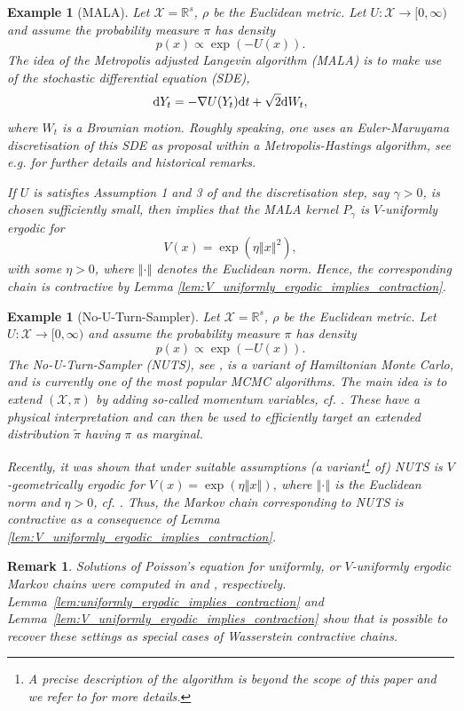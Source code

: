 \documentclass[12pt]{article}
\theoremstyle{plain}
\newtheorem{rem}[thm]{Remark}
\newtheorem{example}[thm]{Example}
\renewcommand{\d}{{\rm d}}
\newcommand{\norm}[1]{\left\Vert #1 \right\Vert}
\newcommand{\R}{\mathbb{R}}
\newcommand{\cX}{\mathcal{X}}
\begin{document}
{\begin{example}[MALA]\label{ex:MALA}
Let $\cX = \R^s$, $\rho$ be the Euclidean metric. 
Let $U \colon \cX \to [0, \infty)$ and assume the probability measure $\pi$ has density 
\[
p(x) \propto \exp(-U(x)).
\]
The idea of the Metropolis adjusted Langevin algorithm (MALA) is to make use of the stochastic differential equation (SDE), 
\[
\d Y_t = - \nabla U(Y_t)\d t + \sqrt{2}\d W_t, 
\]
where $W_t$ is a Brownian motion. 
Roughly speaking, one uses an Euler-Maruyama discretisation of this SDE as proposal within a Metropolis-Hastings algorithm, see e.g. \cite{durmus2023MALA} for further details and historical remarks. 

If $U$ is satisfies Assumption 1 and 3 of \cite{durmus2023MALA} and the discretisation step, say $\gamma>0$, is chosen sufficiently small, then \cite[Theorem 1]{durmus2023MALA} implies that the MALA kernel $P_\gamma$ is $V$-uniformly ergodic for 
\[
V(x) = \exp (\eta \norm{x}^2),
\]
with some $\eta >0$, where $\norm{\cdot}$ denotes the Euclidean norm. Hence, the corresponding chain is contractive by Lemma \ref{lem:V_uniformly_ergodic_implies_contraction}.
\end{example}

\begin{example}[No-U-Turn-Sampler]\label{ex:NUTS}
Let $\cX = \R^s$, $\rho$ be the Euclidean metric. 
Let $U \colon \cX \to [0, \infty)$ and assume the probability measure $\pi$ has density 
\[
p(x) \propto \exp(-U(x)).
\]
The No-U-Turn-Sampler (NUTS), see \cite{hoffman2014no}, is a variant of Hamiltonian Monte Carlo, and is currently one of the most popular MCMC algorithms. 
The main idea is to extend $(\cX, \pi)$ 
by adding so-called momentum variables, cf. \cite{hoffman2014no}. 
These  have a physical interpretation and can then be used to efficiently target an extended distribution $\widetilde{\pi}$ having $\pi$ as marginal.  

Recently, it was shown that under suitable assumptions (a variant\footnote{A precise description of the algorithm is beyond the scope of this paper and we refer to \cite{durmus2023convergence} for more details.} of) NUTS is $V$-geometrically ergodic for $V(x) = \exp(\eta \norm{x})$, where $\norm{\cdot} $ is the Euclidean norm and $\eta>0$, cf. \cite[Theorem 17]{durmus2023convergence}.
Thus, the Markov chain corresponding to NUTS is contractive as a consequence of Lemma \ref{lem:V_uniformly_ergodic_implies_contraction}. 
\end{example}

\begin{rem}
Solutions of Poisson's equation for uniformly, or $V$-uniformly ergodic Markov chains were computed in \cite{GLYNN2002hoeffding} and \cite{glynn1996liapounov}, respectively. 
Lemma~\ref{lem:uniformly_ergodic_implies_contraction} and Lemma~\ref{lem:V_uniformly_ergodic_implies_contraction} show that is possible to recover these settings as special cases of Wasserstein contractive chains.
\end{rem}


}
\end{document}
